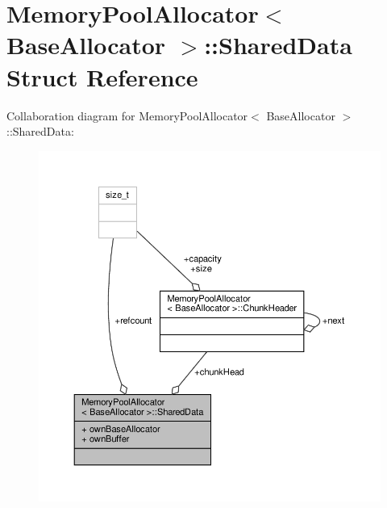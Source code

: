 \hypertarget{structMemoryPoolAllocator_1_1SharedData}{}\section{Memory\+Pool\+Allocator$<$ Base\+Allocator $>$\+:\+:Shared\+Data Struct Reference}
\label{structMemoryPoolAllocator_1_1SharedData}


Collaboration diagram for Memory\+Pool\+Allocator$<$ Base\+Allocator $>$\+:\+:Shared\+Data\+:
\nopagebreak
\begin{figure}[H]
\begin{center}
\leavevmode
\includegraphics[width=350pt]{structMemoryPoolAllocator_1_1SharedData__coll__graph}
\end{center}
\end{figure}
